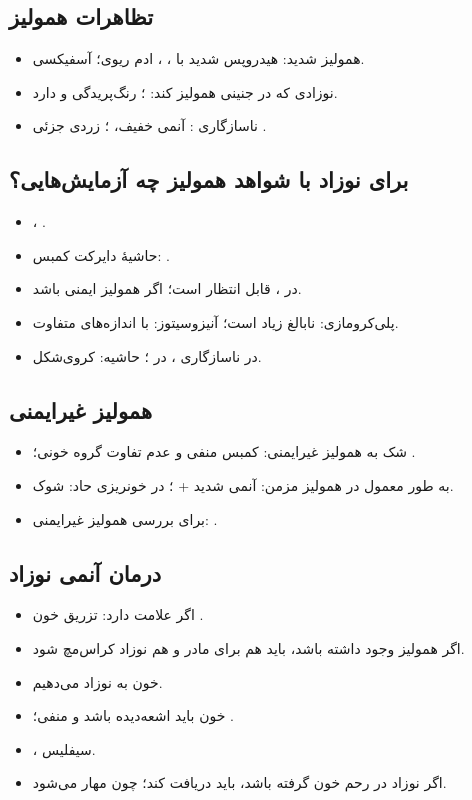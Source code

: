 \documentclass[12pt,a4paper]{article}
\begin{document}
\subsection*{تظاهرات همولیز}
\begin{itemize}
\item همولیز شدید: هیدروپس شدید با ، ، ادم ریوی؛ آسفیکسی.
\item نوزادی که در جنینی همولیز کند: ؛
رنگ‌پریدگی و  دارد.
\item ناسازگاری : آنمی خفیف، ؛
زردی جزئی .
\end{itemize}
\subsection*{برای نوزاد با شواهد همولیز چه آزمایش‌هایی؟}
\begin{itemize}
\item {}، .
\item حاشیهٔ دایرکت کمبس: .
\item در ،  قابل انتظار است؛ اگر همولیز ایمنی باشد.
\item پلی‌کرومازی:  نابالغ زیاد است؛ آنیزوسیتوز:  با اندازه‌های متفاوت.
\item در ناسازگاری ،  در ؛
حاشیه:  کروی‌شکل.
\end{itemize}

\subsection*{همولیز غیرایمنی}
\begin{itemize}
\item شک به همولیز غیرایمنی: کمبس منفی و عدم تفاوت گروه خونی؛
.
\item به طور معمول در همولیز مزمن: آنمی شدید + ؛ در خونریزی حاد: شوک.
\item برای بررسی همولیز غیرایمنی: .
\end{itemize}
\subsection*{درمان آنمی نوزاد}
\begin{itemize}
\item اگر علامت دارد: تزریق خون .
\item اگر همولیز وجود داشته باشد،  باید هم برای مادر و هم نوزاد کراس‌مچ شود.
\item {} خون به نوزاد می‌دهیم.
\item خون باید اشعه‌دیده باشد و  منفی؛ .
\item {}، سیفلیس.
\item اگر نوزاد در رحم خون گرفته باشد، باید  دریافت کند؛ چون مهار می‌شود.
\end{itemize}
\end{document}
